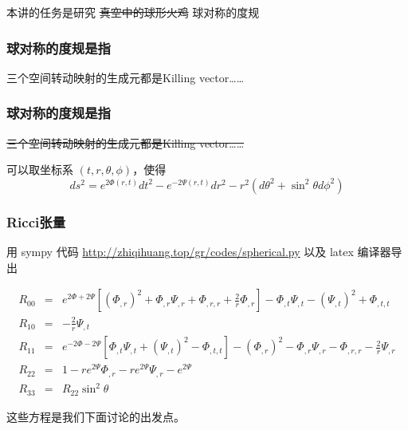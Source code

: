 \documentclass[CJK,13pt]{beamer}
\date{}
\begin{document}
  \bch


  \begin{frame}
    本讲的任务是研究 \sout{真空中的球形火鸡} 球对称的度规

  \end{frame}
  
  \begin{frame}
    \frametitle{球对称的度规是指}

    三个空间转动映射的生成元都是Killing vector……

    
  \end{frame}

  \begin{frame}
  \frametitle{球对称的度规是指}

  \sout{三个空间转动映射的生成元都是Killing vector……}

  \skipline
  
    可以取坐标系 $(t, r, \theta,\phi)$，使得
   {\blue $$ ds^2 = e^{2\Phi(r,t)}dt^2 - e^{-2\Psi(r, t)}dr^2 - r^2\left(d\theta^2 + \sin^2\theta d\phi^2\right)$$}
    
    
  \end{frame}

  \begin{frame}
    \frametitle{Ricci张量}
    用 sympy 代码 \url{http://zhiqihuang.top/gr/codes/spherical.py} 以及 latex 编译器导出
    {\small

\begin{eqnarray}
R_{00} &=&  e^{2 \Phi + 2 \Psi} \left[\left(\Phi_{,r}\right)^{2} +  \Phi_{,r} \Psi_{, r} + \Phi_{,r,r}+\frac{2}{r}  \Phi_{,r}\right] - \Phi_{,t} \Psi_{,t} - \left(\Psi_{,t}\right)^{2} + \Phi_{,t,t}  \nonumber \\
R_{10} &=& - \frac{2}{r} \Psi_{,t} \nonumber \\
R_{11} &=&  e^{- 2 \Phi- 2 \Psi} \left[\Phi_{,t} \Psi_{,t} +  \left(\Psi_{,t}\right)^{2} -  \Phi_{,t,t} \right]- \left(\Phi_{,r}\right)^{2} - \Phi_{,r} \Psi_{, r} - \Phi_{,r,r} - \frac{2}{r} \Psi_{, r} \nonumber \\
R_{22} &=& 1 - r e^{2 \Psi} \Phi_{,r} - r e^{2 \Psi} \Psi_{, r} - e^{2 \Psi}  \nonumber \\
R_{33} &=& R_{22} \sin^2\theta \nonumber 
\end{eqnarray}
    }
    这些方程是我们下面讨论的出发点。
  \end{frame}
\end{document}
